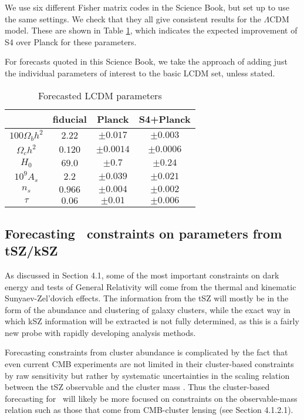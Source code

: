 We use six different Fisher matrix codes in the Science Book, but set up to use the same settings. We check that they all give consistent results for the $\Lambda$CDM model. These are shown in Table \ref{tab:fisher}, which indicates the expected improvement of S4 over Planck for these parameters. 

For forecasts quoted in this Science Book, we take the approach of adding just the individual parameters of interest to the basic LCDM set, unless stated.

\begin{table}
  \centering
\caption{\small Forecasted LCDM parameters}
\begin{tabular}{c  c  c  c  }
\hline
\hline
  & fiducial & Planck &  S4+Planck \\
 \hline
$100\Omega_bh^2$   & $2.22$ & $\pm 0.017$ & $\pm 0.003$ \\
$\Omega_ch^2$      & $0.120$ &$\pm 0.0014$  & $\pm 0.0006$  \\
$H_0$              & $69.0$ &  $\pm 0.7$     & $\pm 0.24$    \\
$10^{9}A_s$        & $2.2$  &$\pm 0.039$   & $\pm0.021$  \\
$n_s$             & $0.966$&  $\pm 0.004$   & $\pm0.002$ \\
$\tau$            & $0.06$ &  $\pm 0.01$   & $\pm0.006$ \\
\hline
\end{tabular}
\label{tab:fisher}
  \end{table}




\subsection{Forecasting \cmbexp\ constraints on parameters from tSZ/kSZ}

As discussed in Section 4.1, some of the most important constraints on dark energy and tests of 
General Relativity will come from the thermal and kinematic Sunyaev-Zel'dovich effects. The information
from the tSZ will mostly be in the form of the abundance and clustering of galaxy clusters, while the 
exact way in which kSZ information will be extracted is not fully determined, as this is a fairly new probe
with rapidly developing analysis methods.

Forecasting constraints from cluster abundance is complicated by the fact that even current CMB 
experiments are not limited in their cluster-based constraints by raw sensitivity but rather by systematic
uncertainties in the scaling relation between the tSZ observable and the cluster mass 
\cite{Reichardt:2012yj,Ade:2015fva}. Thus the cluster-based forecasting for \cmbexp\ will likely be more
focused on constraints on the observable-mass relation such as those that come from CMB-cluster
lensing (see Section 4.1.2.1).

